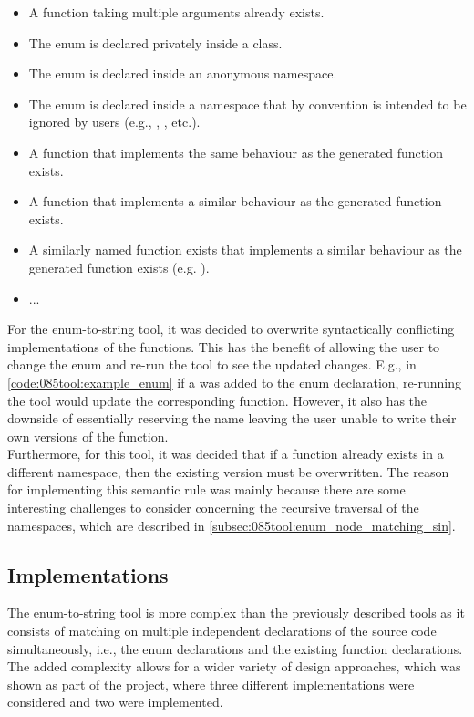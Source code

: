 \begin{itemize}
    \vspace{-0.75em}
    \item A  function taking multiple arguments already exists.
    \item The enum is declared privately inside a class.
    \item The enum is declared inside an anonymous namespace.
    \item The enum is declared inside a namespace that by convention is intended to be ignored by users (e.g., , , etc.).
    \item A function that implements the same behaviour as the generated  function exists.
    \item A function that implements a similar behaviour as the generated  function exists.
    \item A similarly named function exists that implements a similar behaviour as the generated  function exists (e.g. ).
    \item ...
\end{itemize}

For the enum-to-string tool, it was decided to overwrite syntactically conflicting implementations of the  functions.
This has the benefit of allowing the user to change the enum and re-run the tool to see the updated changes. E.g., in \cref{code:085tool:example_enum} if a  was added to the enum declaration, re-running the tool would update the corresponding  function.
However, it also has the downside of essentially reserving the  name leaving the user unable to write their own versions of the function.\\
Furthermore, for this tool, it was decided that if a  function already exists in a different namespace, then the existing version must be overwritten. The reason for implementing this semantic rule was mainly because there are some interesting challenges to consider concerning the recursive traversal of the namespaces, which are described in \cref{subsec:085tool:enum_node_matching_sin}.
\pagebreak
\subsection{Implementations}
The enum-to-string tool is more complex than the previously described tools as it consists of matching on multiple independent declarations of the source code simultaneously, i.e., the enum declarations and the existing  function declarations. The added complexity allows for a wider variety of design approaches, which was shown as part of the project, where three different implementations were considered and two were implemented.

